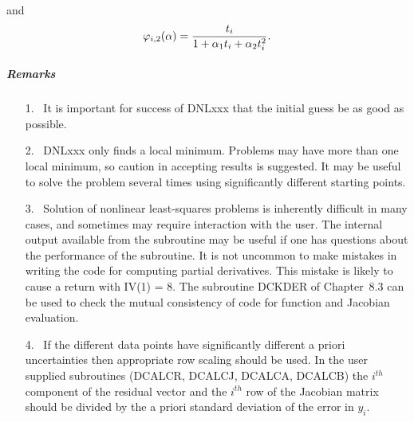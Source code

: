 \documentclass[twoside]{MATH77}
\begin{document}
\vspace{-4pt}and
\begin{equation}
\label{O11}\varphi _{i,2}({\bf \alpha })=\frac{t_i}{1+\alpha _1t_i+\alpha
_2t_i^2}.
\end{equation}

\subparagraph{Remarks}
\begin{itemize}
\item[1.]  \ It is important for success of DNLxxx that the initial guess
be as good as possible.
\item[2.]  \ DNLxxx only finds a local minimum. Problems may have more than
one local minimum, so caution in accepting results is suggested. It may be
useful to solve the problem several times using significantly different
starting points.
\item[3.]  \ Solution of nonlinear least-squares problems is inherently
difficult in many cases, and sometimes may require interaction with the
user. The internal output available from the subroutine may be useful if one
has questions about the performance of the subroutine. It is not uncommon to
make mistakes in writing the code for computing partial derivatives. This
mistake is likely to cause a return with IV(1) = 8. The subroutine DCKDER of
Chapter~8.3 can be used to check the mutual consistency of code for function
and Jacobian evaluation.
\item[4.]  \ If the different data points have significantly different a
priori uncertainties then appropriate row scaling should be used. In the
user supplied subroutines (DCALCR, DCALCJ, DCALCA, DCALCB) the $i^{th}$
component of the residual vector and the $i^{th}$ row of the Jacobian matrix
should be divided by the a priori standard deviation of the error in $y_i.$


\end{itemize}
\end{document}
